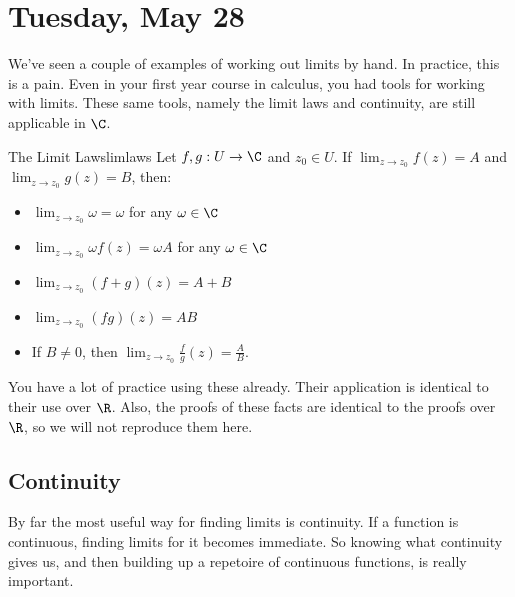\section{Tuesday, May 28}


We've seen a couple of examples of working out limits by hand. In practice, this is a pain. Even in your first year course in calculus, you had tools for working with limits. These same tools, namely the limit laws and continuity, are still applicable in $\C$.

\begin{thmbo}{The Limit Laws}{limlaws}
Let $f,g:U \rightarrow \C$ and $z_0\in U$. If $\lim_{z\rightarrow z_0} f(z) = A$ and $\lim_{z\rightarrow z_0} g(z) = B$, then:

\begin{itemize}
\item $\lim_{z\rightarrow z_0} \omega = \omega$ for any $\omega \in \C$
\item $\lim_{z\rightarrow z_0} \omega f(z) = \omega A$ for any $\omega \in \C$
\item $\lim_{z\rightarrow z_0} (f+g)(z) = A + B$
\item $\lim_{z\rightarrow z_0} (fg)(z) = AB$
\item If $B\ne 0$, then $\lim_{z\rightarrow z_0} \frac{f}{g}(z) = \frac{A}{B}$.
\end{itemize}
\end{thmbo}

You have a lot of practice using these already. Their application is identical to their use over $\R$. Also, the proofs of these facts are identical to the proofs over $\R$, so we will not reproduce them here.

\subsection{Continuity}

By far the most useful way for finding limits is continuity. If a function is continuous, finding limits for it becomes immediate. So knowing what continuity gives us, and then building up a repetoire of continuous functions, is really important.

